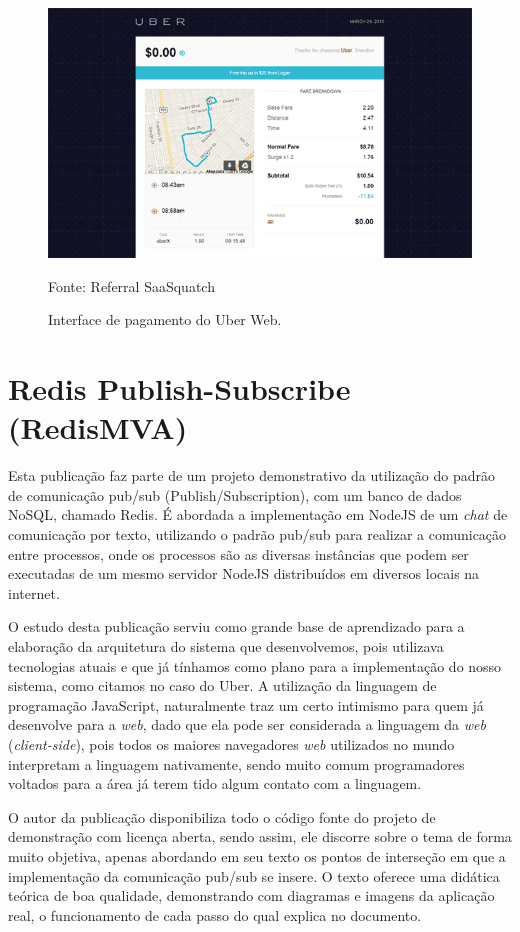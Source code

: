 \begin{figure}[H]
	\centering
	\includegraphics[scale=0.7]{imagens/uber2.png}
	\caption{\small Interface de pagamento do Uber Web.} Fonte: Referral SaaSquatch \cite{uber-imgs}
	\label{fig:uber-payment-interface}
\end{figure}

\section{Redis Publish-Subscribe (RedisMVA) }
Esta publicação \cite{redis-pubsub-redismva} faz parte de um projeto demonstrativo da utilização do padrão de comunicação pub/sub (Publish/Subscription), com um banco de dados NoSQL, chamado Redis. É abordada a implementação em NodeJS de um \textit{chat} de comunicação por texto, utilizando o padrão pub/sub para realizar a comunicação entre processos, onde os processos são as diversas instâncias que podem ser executadas de um mesmo servidor NodeJS distribuídos em diversos locais na internet.

O estudo desta publicação serviu como grande base de aprendizado para a elaboração da arquitetura do sistema que desenvolvemos, pois utilizava tecnologias atuais e que já tínhamos como plano para a implementação do nosso sistema, como citamos no caso do Uber. A utilização da linguagem de programação JavaScript, naturalmente traz um certo intimismo para quem já desenvolve para a \textit{web}, dado que ela pode ser considerada a linguagem da \textit{web} (\textit{client-side}), pois todos os maiores navegadores \textit{web} \cite{browsers-usage} utilizados no mundo interpretam a linguagem nativamente, sendo muito comum programadores voltados para a área já terem tido algum contato com a linguagem.

O autor da publicação disponibiliza todo o código fonte do projeto de demonstração com licença aberta, sendo assim, ele discorre sobre o tema de forma muito objetiva, apenas abordando em seu texto os pontos de interseção em que a implementação da comunicação pub/sub se insere. O texto oferece uma didática teórica de boa qualidade, demonstrando com diagramas e imagens da aplicação real, o funcionamento de cada passo do qual explica no documento.


